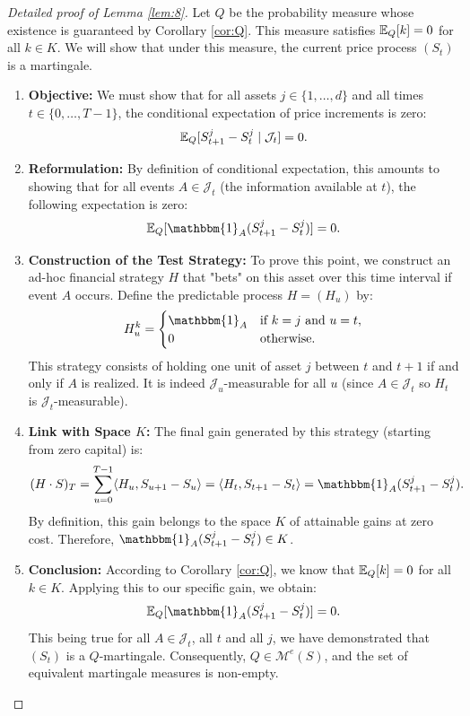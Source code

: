 \begin{proof}[Detailed proof of Lemma \ref{lem:8}]
Let $Q$ be the probability measure whose existence is guaranteed by Corollary \ref{cor:Q}. This measure satisfies $\mathbb{E}_Q[k]=0$ for all $k \in K$. We will show that under this measure, the current price process $(S_t)$ is a martingale.

\begin{enumerate}
    \item \textbf{Objective:} We must show that for all assets $j \in \{1,\dots,d\}$ and all times $t \in \{0,\dots,T-1\}$, the conditional expectation of price increments is zero:
    \[
    \mathbb{E}_Q[S_{t+1}^j - S_t^j \mid \mathcal{J}_t] = 0.
    \]
    
    \item \textbf{Reformulation:} By definition of conditional expectation, this amounts to showing that for all events $A \in \mathcal{J}_t$ (the information available at $t$), the following expectation is zero:
    \[
    \E_Q[\mathbbm{1}_A (S_{t+1}^j - S_t^j)] = 0.
    \]
    
    \item \textbf{Construction of the Test Strategy:} To prove this point, we construct an ad-hoc financial strategy $H$ that "bets" on this asset over this time interval if event $A$ occurs. Define the predictable process $H = (H_u)$ by:
    \[
    H_u^k = 
    \begin{cases} 
    \mathbbm{1}_A & \text{if } k=j \text{ and } u=t, \\
    0 & \text{otherwise.}
    \end{cases}
    \]
    This strategy consists of holding one unit of asset $j$ between $t$ and $t+1$ if and only if $A$ is realized. It is indeed $\mathcal{J}_u$-measurable for all $u$ (since $A \in \mathcal{J}_t$ so $H_t$ is $\mathcal{J}_t$-measurable).
    
    \item \textbf{Link with Space $K$:} The final gain generated by this strategy (starting from zero capital) is:
    \[
    (H \cdot S)_T = \sum_{u=0}^{T-1} \langle H_u, S_{u+1} - S_u \rangle = \langle H_t, S_{t+1} - S_t \rangle = \mathbbm{1}_A (S_{t+1}^j - S_t^j).
    \]
    By definition, this gain belongs to the space $K$ of attainable gains at zero cost. Therefore, $\mathbbm{1}_A (S_{t+1}^j - S_t^j) \in K$.
    
    \item \textbf{Conclusion:} According to Corollary \ref{cor:Q}, we know that $\mathbb{E}_Q[k] = 0$ for all $k \in K$. Applying this to our specific gain, we obtain:
    \[
    \E_Q[\mathbbm{1}_A (S_{t+1}^j - S_t^j)] = 0.
    \]
    This being true for all $A \in \mathcal{J}_t$, all $t$ and all $j$, we have demonstrated that $(S_t)$ is a $Q$-martingale. Consequently, $Q \in \mathcal{M}^e(S)$, and the set of equivalent martingale measures is non-empty.
\end{enumerate}
\end{proof}

